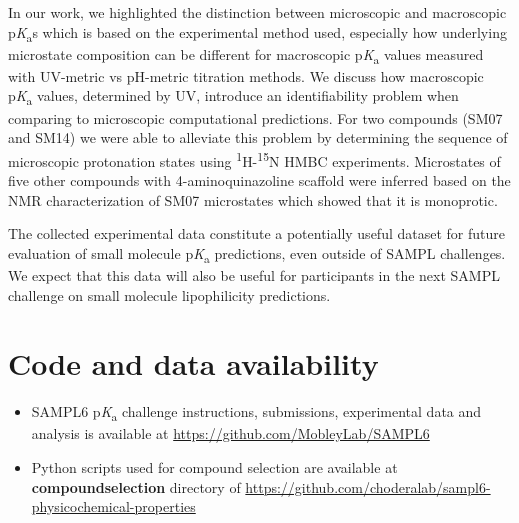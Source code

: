\documentclass[9pt,lineno]{elife}
\newcommand{\pKa}{p\textit{K}\textsubscript{a}}
\begin{document}
In our work, we highlighted the distinction between microscopic and macroscopic \pKa{}s which is based on the experimental method used, especially how underlying microstate composition can be different for macroscopic \pKa{} values measured with UV-metric vs pH-metric titration methods. 
We discuss how macroscopic \pKa{} values, determined by UV, introduce an identifiability problem when comparing to microscopic computational predictions.
For two compounds (SM07 and SM14) we were able to alleviate this problem by determining the sequence of microscopic protonation states using \textsuperscript{1}H-\textsuperscript{15}N HMBC experiments.
Microstates of five other compounds with 4-aminoquinazoline scaffold were inferred based on the NMR characterization of SM07 microstates which showed that it is monoprotic. 

The collected experimental data constitute a potentially useful dataset for future evaluation of small molecule \pKa{} predictions, even outside of SAMPL challenges. We expect that this data will also be useful for participants in the next SAMPL challenge on small molecule lipophilicity predictions.


\section{Code and data availability}
\begin{minipage}{15cm}
\begin{itemize}

\item SAMPL6 \pKa{} challenge instructions, submissions, experimental data and analysis is available at  \href{https://github.com/MobleyLab/SAMPL6}{https://github.com/MobleyLab/SAMPL6}

\item Python scripts used for compound selection are available at \textbf{compound\textunderscore selection} directory of  
\href{https://github.com/choderalab/sampl6\textendash physicochemical\textendash properties}{https://github.com/choderalab/sampl6-physicochemical-properties}

\end{itemize}
\end{minipage}


\end{document}
